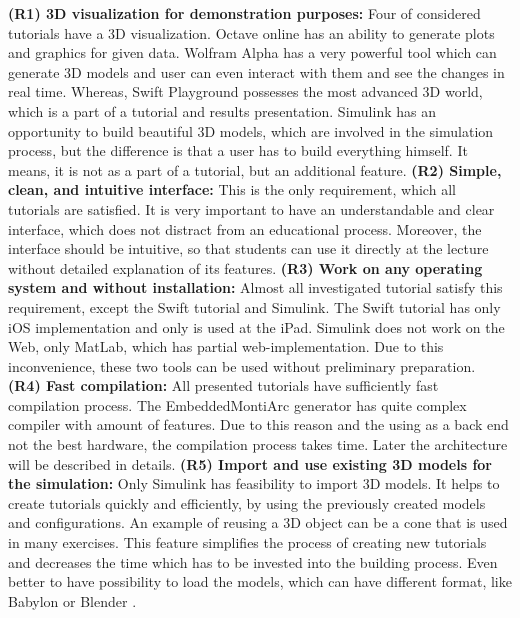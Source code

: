 \textbf{(R1) 3D visualization for demonstration purposes:} Four of considered tutorials have a 3D visualization. Octave online has an ability to generate plots and graphics for given data. Wolfram Alpha has a very powerful tool which can generate 3D models and user can even interact with them and see the changes in real time. Whereas, Swift Playground possesses the most advanced 3D world, which is a part of a tutorial and results presentation. Simulink has an opportunity to build beautiful 3D models, which are involved in the simulation process, but the difference is that a user has to build everything himself. It means, it is not as a part of a tutorial, but an additional feature.\newline
\textbf{(R2) Simple, clean, and intuitive interface:} This is the only requirement, which all tutorials are satisfied. It is very important to have an understandable and clear interface, which does not distract from an educational process. Moreover, the interface should be intuitive, so that students can use it directly at the lecture without detailed explanation of its features.\newline
\textbf{(R3) Work on any operating system and without installation:} Almost all investigated tutorial satisfy this requirement, except the Swift tutorial and Simulink. The Swift tutorial has only iOS implementation and only is used at the iPad. Simulink does not work on the Web, only MatLab, which has partial web-implementation. Due to this inconvenience, these two tools can be used without preliminary preparation.\newline
\textbf{(R4) Fast compilation:} All presented tutorials have sufficiently fast compilation process. The EmbeddedMontiArc generator has quite complex compiler with amount of features. Due to this reason and the using as a back end not the best hardware, the compilation process takes time. Later the architecture will be described in details.\newline
\textbf{(R5) Import and use existing 3D models for the simulation:} Only Simulink has feasibility to import 3D models. It helps to create tutorials quickly and efficiently, by using the previously created models and configurations. An example of reusing a 3D object can be a cone that is used in many exercises. This feature simplifies the process of creating new tutorials and decreases the time which has to be invested into the building process. Even better to have possibility to load the models, which can have different format, like Babylon \cite{Babylon} or Blender \cite{Blender}. \newline
